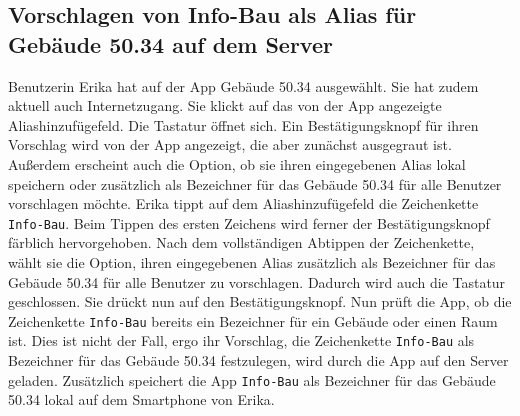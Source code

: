 \subsection{Vorschlagen von Info-Bau als Alias für Gebäude 50.34 auf dem Server}

Benutzerin Erika hat auf der App Gebäude 50.34 ausgewählt. 
Sie hat zudem aktuell auch Internetzugang. 
Sie klickt auf das von der App angezeigte Aliashinzufügefeld. 
Die Tastatur öffnet sich. 
Ein Bestätigungsknopf für ihren Vorschlag wird von der App angezeigt, die aber zunächst ausgegraut ist. 
Außerdem erscheint auch die Option, ob sie ihren eingegebenen Alias lokal speichern oder zusätzlich als Bezeichner für das Gebäude 50.34 für alle Benutzer vorschlagen möchte. 
Erika tippt auf dem Aliashinzufügefeld die Zeichenkette \texttt{Info-Bau}. 
Beim Tippen des ersten Zeichens wird ferner der Bestätigungsknopf färblich hervorgehoben. 
Nach dem vollständigen Abtippen der Zeichenkette, wählt sie die Option, ihren eingegebenen Alias zusätzlich als Bezeichner für das Gebäude 50.34 für alle Benutzer zu vorschlagen. 
Dadurch wird auch die Tastatur geschlossen. Sie drückt nun auf den Bestätigungsknopf. 
Nun prüft die App, ob die Zeichenkette \texttt{Info-Bau} bereits ein Bezeichner für ein Gebäude oder einen Raum ist. 
Dies ist nicht der Fall, ergo ihr Vorschlag, die Zeichenkette \texttt{Info-Bau} als Bezeichner für das Gebäude 50.34 festzulegen, wird durch die App auf den Server geladen. 
Zusätzlich speichert die App \texttt{Info-Bau} als Bezeichner für das Gebäude 50.34 lokal auf dem Smartphone von Erika.